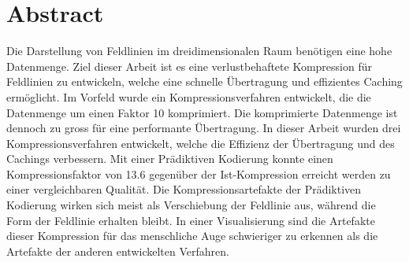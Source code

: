 \section*{Abstract}
Die Darstellung von Feldlinien im dreidimensionalen Raum benötigen eine hohe Datenmenge. Ziel dieser Arbeit ist es eine verlustbehaftete Kompression für Feldlinien zu entwickeln, welche eine schnelle Übertragung und effizientes Caching ermöglicht. Im Vorfeld wurde ein Kompressionsverfahren entwickelt, die die Datenmenge um einen Faktor 10 komprimiert. Die komprimierte Datenmenge ist dennoch zu gross für eine performante Übertragung. In dieser Arbeit wurden drei Kompressionsverfahren entwickelt, welche die Effizienz der Übertragung und des Cachings verbessern. Mit einer Prädiktiven Kodierung konnte einen Kompressionsfaktor von 13.6  gegenüber der Ist-Kompression erreicht werden zu einer vergleichbaren Qualität. Die Kompressionsartefakte der Prädiktiven Kodierung wirken sich meist als Verschiebung der Feldlinie aus, während die Form der Feldlinie erhalten bleibt. In einer Visualisierung sind die Artefakte dieser Kompression für das menschliche Auge schwieriger zu erkennen als die Artefakte der anderen entwickelten Verfahren.